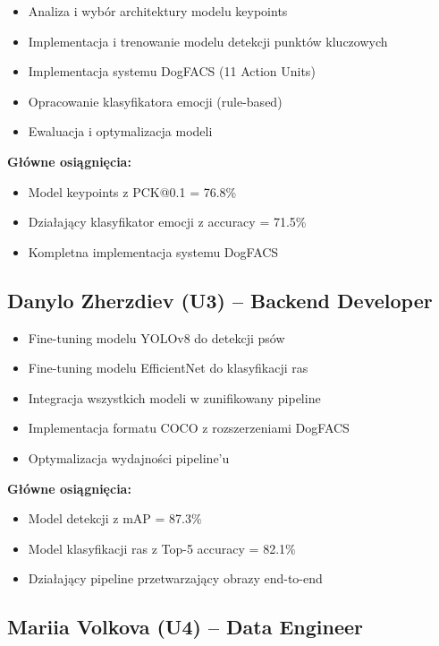 \documentclass[12pt,a4paper]{article}
\begin{document}
\begin{itemize}
    \item Analiza i wybór architektury modelu keypoints
    \item Implementacja i trenowanie modelu detekcji punktów kluczowych
    \item Implementacja systemu DogFACS (11 Action Units)
    \item Opracowanie klasyfikatora emocji (rule-based)
    \item Ewaluacja i optymalizacja modeli
\end{itemize}

\textbf{Główne osiągnięcia:}
\begin{itemize}
    \item Model keypoints z PCK@0.1 = 76.8\%
    \item Działający klasyfikator emocji z accuracy = 71.5\%
    \item Kompletna implementacja systemu DogFACS
\end{itemize}

\subsection{Danylo Zherzdiev (U3) -- Backend Developer}

\begin{itemize}
    \item Fine-tuning modelu YOLOv8 do detekcji psów
    \item Fine-tuning modelu EfficientNet do klasyfikacji ras
    \item Integracja wszystkich modeli w zunifikowany pipeline
    \item Implementacja formatu COCO z rozszerzeniami DogFACS
    \item Optymalizacja wydajności pipeline'u
\end{itemize}

\textbf{Główne osiągnięcia:}
\begin{itemize}
    \item Model detekcji z mAP = 87.3\%
    \item Model klasyfikacji ras z Top-5 accuracy = 82.1\%
    \item Działający pipeline przetwarzający obrazy end-to-end
\end{itemize}

\subsection{Mariia Volkova (U4) -- Data Engineer}
\end{document}
